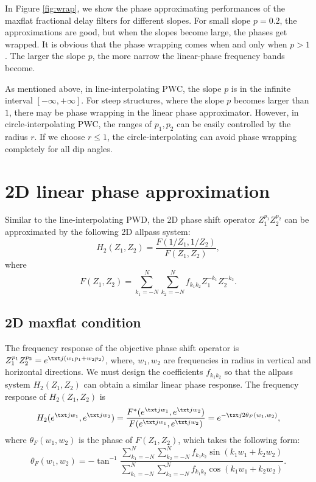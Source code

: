 In Figure \ref{fig:wrap}, we show the phase approximating performances
of the maxflat fractional delay filters for different slopes.  For
small slope $p=0.2$, the approximations are good, but when the slopes
become large, the phases get wrapped.  It is obvious
that the phase wrapping comes when and only when $p>1$.  The larger
the slope $p$, the more narrow
the linear-phase frequency bands become. 

As mentioned above, in line-interpolating PWC,
the slope $p$ is in the infinite interval $[-\infty,+\infty]$.
For steep structures, 
where the slope $p$ becomes larger than $1$, 
there may be phase wrapping in the linear phase approximator.
However, in circle-interpolating PWC,
the ranges of $p_1,p_2$ can be easily controlled by the radius $r$.
If we choose $r\leq 1$, 
the circle-interpolating can avoid phase wrapping completely for all dip angles.

\section{2D linear phase approximation}

Similar to the line-interpolating PWD,
the 2D phase shift operator $Z_1^{p_1}Z_2^{p_2}$
can be approximated by the following 2D allpass system:
\begin{equation}
H_2(Z_1,Z_2)=
\frac{F(1/Z_1,1/Z_2)}{F(Z_1,Z_2)},
\end{equation}
where 
\begin{equation}
F(Z_1,Z_2)=
\sum_{k_1=-N}^N\sum_{k_2=-N}^N
f_{k_1k_2}Z_1^{-k_1}Z_2^{-k_2}.
\end{equation}



\subsection{2D maxflat condition}

The frequency response of the objective phase shift operator is
$Z_1^{p_1}Z_2^{p_2}=e^{\txt j(w_1p_1+w_2p_2)}$,
where, $w_1,w_2$ are frequencies in radius 
in vertical and horizontal directions.
We must design the coefficients $f_{k_1k_2}$ so that 
the allpass system $H_2(Z_1,Z_2)$ can obtain a similar linear phase response.
The frequency response of $H_2(Z_1,Z_2)$ is
\begin{equation}
H_2(e^{\txt jw_1},e^{\txt jw_2})
=\frac{
F^*(e^{\txt jw_1},e^{\txt jw_2})
}{
F(e^{\txt jw_1},e^{\txt jw_2})
}=e^{-\txt j2\theta_F(w_1,w_2)},
\end{equation}
where $\theta_F(w_1,w_2)$ is the phase of $F(Z_1,Z_2)$,
which takes the following form:
\begin{equation}
\theta_F(w_1,w_2)=-\tan^{-1}\frac{
\displaystyle{\sum_{k_1=-N}^N\sum_{k_2=-N}^N
f_{k_1k_2}\sin(k_1w_1+k_2w_2)}
}{
\displaystyle{\sum_{k_1=-N}^N\sum_{k_2=-N}^N
f_{k_1k_2}\cos(k_1w_1+k_2w_2)}
}.
\end{equation}

